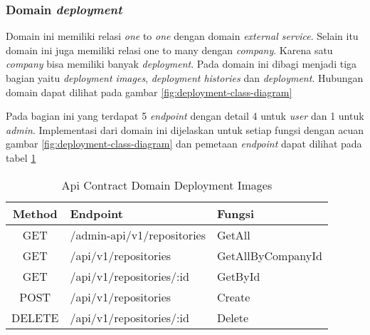 \subsubsection{Domain \textit{deployment}}

Domain ini memiliki relasi \textit{one} to \textit{one} dengan domain \textit{external service}. Selain itu domain ini juga memiliki relasi one to many dengan \textit{company}. Karena satu \textit{company} bisa memiliki banyak \textit{deployment}. Pada domain ini dibagi menjadi tiga bagian yaitu \textit{deployment images}, \textit{deployment histories} dan \textit{deployment}. Hubungan domain dapat dilihat pada gambar \ref{fig:deployment-class-diagram}

Pada bagian ini yang terdapat 5 \textit{endpoint} dengan detail 4 untuk \textit{user} dan 1 untuk \textit{admin}. Implementasi dari domain ini dijelaskan untuk setiap fungsi dengan acuan gambar \ref{fig:deployment-class-diagram} dan pemetaan \textit{endpoint} dapat dilihat pada tabel \ref{tab:api-contract-domain-deployment-images}

\bgroup
\begin{table}[htbp]
    \caption{Api Contract Domain Deployment Images}
    \label{tab:api-contract-domain-deployment-images}
    \def\arraystretch{1.7}
    \centering
    \begin{tabular}{|c|p{6cm}|p{4cm}|}
        \hline
        Method & Endpoint                   &
        Fungsi                                                  \\
        \hline
        GET    & /admin-api/v1/repositories & GetAll            \\
        \hline
        GET    & /api/v1/repositories       & GetAllByCompanyId \\
        \hline
        GET    & /api/v1/repositories/:id   & GetById           \\
        \hline
        POST   & /api/v1/repositories       & Create            \\
        \hline
        DELETE & /api/v1/repositories/:id   & Delete            \\
        \hline
    \end{tabular}
\end{table}
\egroup

\pagebreak

